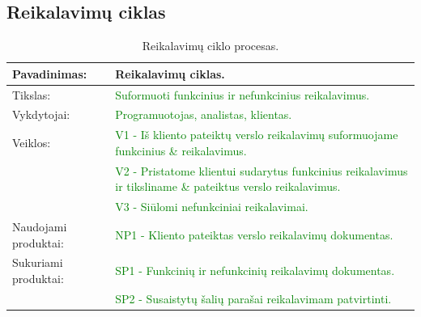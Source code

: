 \documentclass{VUMIFPSkursinis}
\begin{document}
	\subsection{Reikalavimų ciklas}
	\begin{center}
		\begin{table}[ht]
			\caption{Reikalavimų ciklo procesas.}
			\begin{tabular}{ | l | l | }
				\hline
				Pavadinimas:          & Reikalavimų ciklas.                                                                                                            \\ \hline
				Tikslas:              & \textcolor{green}{Suformuoti funkcinius ir nefunkcinius reikalavimus.}                                                         \\ \hline
				Vykdytojai:           & \textcolor{green}{Programuotojas, analistas, klientas.}                                                                        \\ \hline
				Veiklos:              & \textcolor{green}{V1 - Iš kliento pateiktų verslo reikalavimų suformuojame funkcinius \& reikalavimus.}                       \\
				                      & \textcolor{green}{V2 - Pristatome klientui sudarytus funkcinius reikalavimus ir tiksliname \& pateiktus verslo reikalavimus.} \\
				                      & \textcolor{green}{V3 - Siūlomi nefunkciniai reikalavimai.}                                                                     \\ \hline
				Naudojami produktai:  & \textcolor{green}{NP1 - Kliento pateiktas verslo reikalavimų dokumentas.}                                                      \\ \hline
				Sukuriami produktai:  & \textcolor{green}{SP1 - Funkcinių ir nefunkcinių reikalavimų dokumentas.}                                                      \\ \hline
				                      & \textcolor{green}{SP2 - Susaistytų šalių parašai reikalavimam patvirtinti.}                                                    \\ \hline
			\end{tabular}
		\end{table}
	\end{center}
\end{document}

